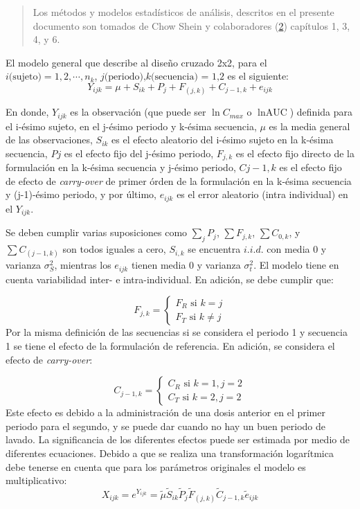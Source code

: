 \documentclass[]{article}
\begin{document}
\begin{quote}
Los métodos y modelos estadísticos de análisis, descritos en el presente
documento son tomados de Chow Shein y colaboradores
(\protect\hyperlink{ref-Chow2009}{2}) capítulos 1, 3, 4, y 6.
\end{quote}

El modelo general que describe al diseño cruzado 2x2, para el
\(i \textrm{(sujeto)} = 1,2,\cdots,n_{k}\),
\(j \textrm{(periodo),} k\textrm{(secuencia) = 1,2}\) es el siguiente:
\[Y_{ijk} = \mu + S_{ik} + P_{j} + F_{(j,k)}+C_{j-1,k}+e_{ijk}\]

En donde, \(Y_{ijk}\) es la observación (que puede ser \(\ln{C_{max}}\)
o \(\ln{\textrm{AUC}}\)) definida para el i-ésimo sujeto, en el j-ésimo
periodo y k-ésima secuencia, \(\mu\) es la media general de las
observaciones, \(S_{ik}\) es el efecto aleatorio del i-ésimo sujeto en
la k-ésima secuencia, \(P{j}\) es el efecto fijo del j-ésimo periodo,
\(F_{j,k}\) es el efecto fijo directo de la formulación en la k-ésima
secuencia y j-ésimo periodo, \(C{j-1,k}\) es el efecto fijo de efecto de
\emph{carry-over} de primer órden de la formulación en la k-ésima
secuencia y (j-1)-ésimo periodo, y por último, \(e_{ijk}\) es el error
aleatorio (intra individual) en el \(Y_{ijk}\).

Se deben cumplir varias suposiciones como \(\sum_{j}{P_{j}}\),
\(\sum{F_{j,k}}\), \(\sum{C_{0,k}}\), y \(\sum{C_{(j-1,k)}}\) son todos
iguales a cero, \(S_{i,k}\) se encuentra \(i.i.d.\) con media 0 y
varianza \(\sigma^{2}_{S}\), mientras los \(e_{ijk}\) tienen media 0 y
varianza \(\sigma_{t}^{2}\). El modelo tiene en cuenta variabilidad
inter- e intra-individual. En adición, se debe cumplir que:

\[F_{j,k} = \left\{\begin{matrix} F_{R} \textrm{ si } k=j \\ F_{T} \textrm{ si } k \neq j \end{matrix}\right.\]
Por la misma definición de las secuencias si se considera el periodo 1 y
secuencia 1 se tiene el efecto de la formulación de referencia. En
adición, se considera el efecto de \emph{carry-over}:

\[C_{j-1,k} = \left\{\begin{matrix} C_{R} \textrm{ si } k = 1, j =2 \\ C_{T} \textrm{ si } k = 2, j =2 \end{matrix}\right.\]
Este efecto es debido a la administración de una dosis anterior en el
primer periodo para el segundo, y se puede dar cuando no hay un buen
periodo de lavado. La significancia de los diferentes efectos puede ser
estimada por medio de diferentes ecuaciones. Debido a que se realiza una
transformación logarítmica debe tenerse en cuenta que para los
parámetros originales el modelo es multiplicativo:
\[X_{ijk} = e^{Y_{ijk}} = \tilde{\mu}\tilde{S}_{ik}\tilde{P}_{j}\tilde{F}_{(j,k)}\tilde{C}_{j-1,k}\tilde{e}_{ijk}\]
\end{document}
